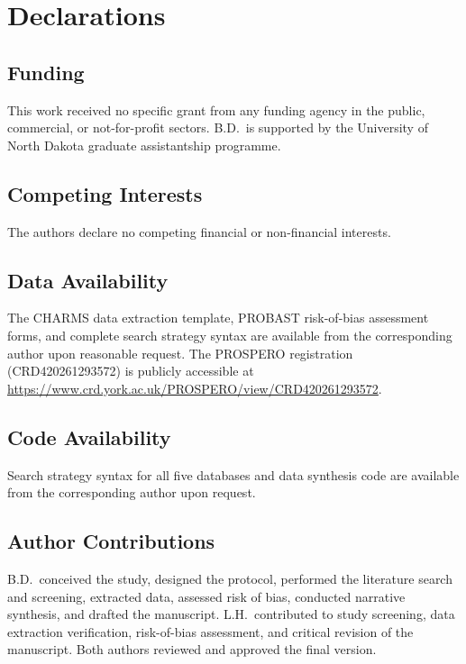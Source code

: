 \documentclass[11pt,a4paper]{article}
\begin{document}
\section*{Declarations}

\subsection*{Funding}
This work received no specific grant from any funding agency in the public, commercial, or not-for-profit sectors. B.D.\ is supported by the University of North Dakota graduate assistantship programme.

\subsection*{Competing Interests}
The authors declare no competing financial or non-financial interests.

\subsection*{Data Availability}
The CHARMS data extraction template, PROBAST risk-of-bias assessment forms, and complete search strategy syntax are available from the corresponding author upon reasonable request. The PROSPERO registration (CRD420261293572) is publicly accessible at \url{https://www.crd.york.ac.uk/PROSPERO/view/CRD420261293572}.

\subsection*{Code Availability}
Search strategy syntax for all five databases and data synthesis code are available from the corresponding author upon request.

\subsection*{Author Contributions}
B.D.\ conceived the study, designed the protocol, performed the literature search and screening, extracted data, assessed risk of bias, conducted narrative synthesis, and drafted the manuscript. L.H.\ contributed to study screening, data extraction verification, risk-of-bias assessment, and critical revision of the manuscript. Both authors reviewed and approved the final version.
\end{document}

